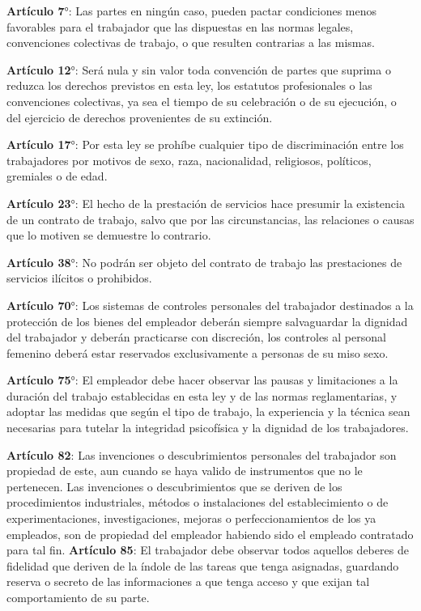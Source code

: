 \textbf{Artículo 7}°: Las partes en ningún caso, pueden pactar condiciones menos favorables para el trabajador que las dispuestas en las normas legales, convenciones colectivas de trabajo, o que resulten contrarias a las mismas.

\textbf{Artículo 12}°: Será nula y sin valor toda convención de partes que suprima o reduzca los derechos previstos en esta ley, los estatutos profesionales o las convenciones colectivas, ya sea el tiempo de su celebración o de su ejecución, o del ejercicio de derechos provenientes de su extinción.

\textbf{Artículo 17}°: Por esta ley se prohíbe cualquier tipo de discriminación entre los trabajadores por motivos de sexo, raza, nacionalidad, religiosos, políticos, gremiales o de edad.

\textbf{Artículo 23}°: El hecho de la prestación de servicios hace presumir la existencia de un contrato de trabajo, salvo que por las circunstancias, las relaciones o causas que lo motiven se demuestre lo contrario.

\textbf{Artículo 38}°: No podrán ser objeto del contrato de trabajo las prestaciones de servicios ilícitos o prohibidos.

\textbf{Artículo 70}°: Los sistemas de controles personales del trabajador destinados a la protección de los bienes del empleador deberán siempre salvaguardar la dignidad del trabajador y deberán practicarse con discreción, los controles al personal femenino deberá estar reservados exclusivamente a personas de su miso sexo.

\textbf{Artículo 75}°: El empleador debe hacer observar las pausas y limitaciones a la duración del trabajo establecidas en esta ley y de las normas reglamentarias, y adoptar las medidas que según el tipo de trabajo, la experiencia y la técnica sean necesarias para tutelar la integridad psicofísica y la dignidad de los trabajadores.



\textbf{Artículo 82}: Las invenciones o descubrimientos personales del trabajador son propiedad de este, aun cuando se haya valido de instrumentos que no le pertenecen. Las invenciones o descubrimientos que se deriven de los procedimientos industriales, métodos o instalaciones del establecimiento o de experimentaciones, investigaciones, mejoras o perfeccionamientos de los ya empleados, son de propiedad del empleador habiendo sido el empleado contratado para tal fin. \textbf{Artículo 85}: El trabajador debe observar todos aquellos deberes de fidelidad que deriven de la índole de las tareas que tenga asignadas, guardando reserva o secreto de las informaciones a que tenga acceso y que exijan tal comportamiento de su parte.

